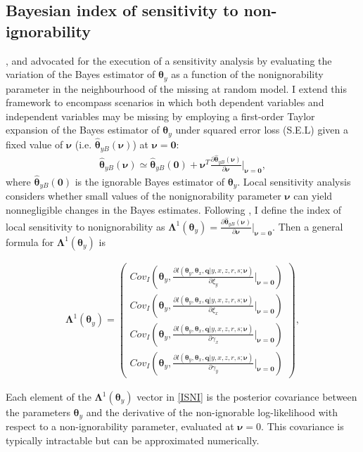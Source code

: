 \documentclass[twoside]{article}
\begin{document}
\subsection{Bayesian index of sensitivity to non-ignorability}
\cite{Zhang:Heitjan:2007}, \cite{Eftekhari:2018} and  \cite{Momeni:Eftekhari:2024} advocated for the execution of a sensitivity analysis by evaluating the variation of the Bayes estimator  of $\pmb\theta_y$ as a function of the nonignorability parameter in the neighbourhood of the missing at random  model. I extend this framework to encompass scenarios in which both dependent variables and independent variables may be missing by employing a first-order Taylor expansion of the Bayes estimator of $\pmb\theta_{y}$ under
squared error loss (S.E.L) given a fixed value of $\pmb\nu$ (i.e. $\hat{\pmb\theta}_{yB}(\pmb\nu)$) at $\pmb\nu =\mathbf{0}$:
\begin{align}\label{lin appr}
\hat{\pmb\theta}_{yB}(\pmb\nu)\simeq\hat{\pmb\theta}_{yB}(\mathbf{0})+\pmb\nu^T\frac{\partial \hat{\pmb\theta}_{yB}(\pmb\nu)}{\partial \pmb\nu}|_{\pmb\nu=\mathbf{0}},
\end{align}
where $\hat{\pmb\theta}_{yB}(\mathbf{0})$ is the ignorable Bayes estimator of $\pmb\theta_{y}$. Local sensitivity analysis considers whether small values
of the nonignorability parameter $\pmb\nu$ can yield nonnegligible
changes in the Bayes estimates. Following \cite{Zhang:Heitjan:2007}, I
define the index of local sensitivity to nonignorability as
$\pmb\Lambda^{1}(\pmb\theta _y)= \frac{\partial \hat{\pmb\theta}_{yB}(\pmb\nu)}{\partial \pmb\nu }\big|_{\pmb\nu=\mathbf{0}}$.
Then a general formula for
$\pmb\Lambda^{1}(\pmb\theta _y)$ is
\begin{footnotesize}\begin{align}\label{ISNI}
\pmb\Lambda^{1}(\pmb\theta_y)  = \begin{pmatrix}
    Cov_I(\pmb\theta_y,\frac{\partial l(\pmb\theta_y,\pmb\theta_x, \mathbf{q} |y,x,z,r,s;\pmb\nu)}{\partial \xi_y}\big|_{\pmb\nu=\mathbf{0}})           \\
   Cov_I(\pmb\theta_y,\frac{\partial l(\pmb\theta_y,\pmb\theta_x, \mathbf{q} |y,x,z,r,s;\pmb\nu)}{\partial \xi_x}\big|_{\pmb\nu=\mathbf{0}})\\
             Cov_I(\pmb\theta_y,\frac{\partial l(\pmb\theta_y,\pmb\theta_x, \mathbf{q} |y,x,z,r,s;\pmb\nu)}{\partial \gamma_x}\big|_{\pmb\nu=\mathbf{0}})\\ 
             Cov_I(\pmb\theta_y,\frac{\partial l(\pmb\theta_y,\pmb\theta_x, \mathbf{q} |y,x,z,r,s;\pmb\nu)}{\partial \gamma_y}\big|_{\pmb\nu=\mathbf{0}})
\end{pmatrix},
\end{align}\end{footnotesize}
Each element of the $\pmb\Lambda^{1}(\pmb\theta_y)$ vector in \eqref{ISNI} is the posterior covariance between the parameters \(\pmb\theta_y\) and the derivative of the non-ignorable log-likelihood with respect to a non-ignorability parameter, evaluated at \(\pmb\nu=0\). This covariance is typically intractable but can be approximated numerically.
\end{document}

